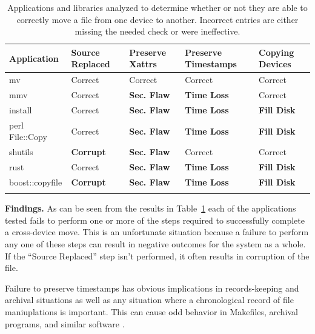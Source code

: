  \begin{table}[t]
    \scriptsize{}
    \begin{tabular}{l p{1cm} p{1cm} p{1.2cm} p{1cm}}
    \toprule{}
        Application     & Source Replaced & Preserve Xattrs & Preserve Timestamps & Copying Devices\\
\hline
        mv              & Correct             & Correct         & Correct             & Correct\\
        mmv             & Correct             & {\bf Sec. Flaw} & {\bf Time
Loss} & Correct\\
        install         & Correct             & {\bf Sec. Flaw} & {\bf Time
Loss} & {\bf Fill Disk} \\
        perl File::Copy & Correct             & {\bf Sec. Flaw} & {\bf Time
Loss} & {\bf Fill Disk} \\
        shutils         & {\bf Corrupt}	& {\bf Sec. Flaw} 	& Correct             & Correct\\
        rust            & Correct             & {\bf Sec. Flaw} & {\bf Time
Loss} & {\bf Fill Disk} \\
        boost::copyfile & {\bf Corrupt}	      & {\bf Sec. Flaw} & {\bf Time
Loss} & {\bf Fill Disk} \\
    \bottomrule{}
    \end{tabular}
    \caption{Applications and libraries analyzed to determine whether or not
      they are able to correctly move a file from one device to another.
Incorrect entries are either missing the needed check or were ineffective.
}
    \label{table:crossdevice}
\end{table}

{\bf Findings.}
As can be seen from the results in Table~\ref{table:crossdevice} each of the
applications tested fails to perform one or more of the steps required to
successfully complete a cross-device move.  This is an unfortunate situation
because a failure to perform any one of these steps can result in negative
outcomes for the system as a whole.  If the ``Source Replaced'' step isn't
performed, it often results in corruption of the file\cite{PythonShutilBug}.

Failure to preserve timestamps has obvious
implications in records-keeping and archival situations as well as any situation
where a chronological record of file maniuplations is important.  This can 
cause odd behavior in Makefiles, archival programs, and similar
software\cite{NautilusTimestamps} \cite{SudoTimestamp}.

